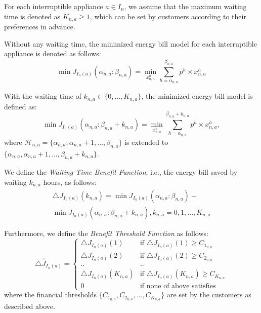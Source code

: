\documentclass[10pt,journal]{IEEEtran}
\theoremstyle{definition}
\theoremstyle{plain} \newtheorem{theo}{Theorem} \newtheorem{prop}{Proposition}  \newtheorem{lemm}{Lemma}
\begin{document}
For each interruptible appliance $a \in I_n$, we assume that the maximum waiting time is denoted as $K_{n,a} \geq 1$, which can be set by customers according to their preferences in advance.

Without any waiting time, the minimized energy bill model for each interruptible appliance is denoted as follows:
\begin{equation}
\min J_{I_n(a)}(\alpha_{n,a} \colon \beta_{n,a}) = \min_{x_{n,a}^h} \sum_{h=\alpha_{n,a}}^{\beta_{n,a}} p^h \times x_{n,a}^h
\end{equation}


With the waiting time of  $k_{n,a} \in \{0,...,K_{n,a}\}$, the minimized energy bill model is defined as:
\begin{equation}
\min J_{I_n(a)}(\alpha_{n,a} \colon \beta_{n,a}+ k_{n,a})= \min_{x_{n,a}^h} \sum_{h=\alpha_{n,a}}^{\beta_{n,a} + k_{n,a}} p^h \times x_{n,a}^h, 
\end{equation} 
where $\mathcal{H}_{n,a} =\{\alpha_{n,a}, \alpha_{n,a}+1,...,\beta_{n,a}\}  $ is extended to $ \{\alpha_{n,a}, \alpha_{n,a}+1,...,\beta_{n,a}+ k_{n,a}\} $.

We define the \textit{Waiting Time Benefit Function}, i.e., the energy bill saved by waiting $k_{n,a}$ hours, as follows:
\begin{equation}
\begin{array}{lr}
\triangle J_{I_n(a)}(k_{n,a}) = \min J_{I_n(a)}(\alpha_{n,a} \colon \beta_{n,a}) - \\
\min J_{I_n(a)}(\alpha_{n,a} \colon \beta_{n,a}+ k_{n,a}), k_{n,a} = 0,1,...,K_{n,a}
\end{array}
\end{equation}

Furthermore, we define the \textit{Benefit Threshold Function} as follows: 
\begin{equation}
\triangle \hat{J}_{I_n(a)} =
\begin{cases} 
\triangle J_{I_n(a)}(1) & \text{if } \triangle J_{I_n(a)}(1) \geq C_{1_{n,a}} \\ 
\triangle J_{I_n(a)}(2) & \text{if }\triangle J_{I_n(a)}(2) \geq C_{2_{n,a}} \\ 
   ..          &    ..  \\
   \triangle J_{I_n(a)}(K_{n,a}) & \text{if }\triangle J_{I_n(a)}(K_{n,a}) \geq C_{K_{n,a}} \\ 
   0                 & \text{if none of above satisfies}
   
\end{cases}
\end{equation}
where the financial thresholds $\{C_{1_{n,a}},C_{2_{n,a}},..., C_{K_{n,a}} \}$ are set by the customers as described above. 
\end{document}
